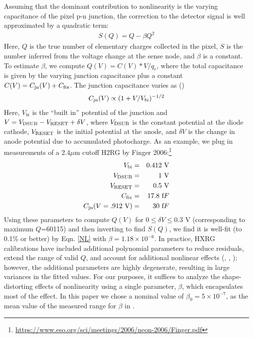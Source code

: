 \documentclass[11pt,preprint,flushrt]{aastex}
\begin{document}
Assuming that the dominant contribution to nonlinearity is the varying capacitance of the pixel p-n junction, the correction to the detector signal is well approximated by a quadratic term:
\begin{align}
S(Q)= Q - \beta Q ^2
\label{NL}
\end{align}
Here, $Q$ is the true number of elementary charges collected in the pixel, $S$ is the number inferred from the voltage change at the sense node, and $\beta$ is a constant.  To estimate $\beta$, we compute $Q(V)=C(V)*V/q_e$, where the total capacitance is given by the varying junction capacitance plus a constant $C(V) = C_{\rm jn}(V) + C_{\rm fix}$. The junction capacitance varies as (\citealt{mccaughrean87})
\begin{equation}
C_{\rm jn}(V) \propto (1+V/V_{bi})^{-1/2}
\end{equation}
Here, $V_{bi}$ is the ``built in'' potential of the junction and $V=V_{\rm DSUB}-V_{\rm RESET}+\delta V$, where $V_{\rm DSUB}$ is the constant potential at the diode cathode, $V_{\rm RESET}$ is the initial potential at the anode, and $\delta V$ is the change in anode potential due to accumulated photocharge.  As an example, we plug in measurements of a 2.4$\mu$m cutoff H2RG by Finger 2006:\footnote{\url{https://www.eso.org/sci/meetings/2006/neon-2006/Finger.pdf}}
\begin{eqnarray*}
V_{\rm bi} &=& 0.412\ {\mbox V} \\
V_{\rm DSUB} &=& 1\ {\mbox V} \\
V_{\rm RESET} &=& 0.5\ {\mbox V} \\
C_{\rm fix} &=& 17.8\ {\mbox fF} \\
C_{\rm jn}(V=.912\ {\mbox V}) &=& 30\ {\mbox fF}
\end{eqnarray*}
Using these parameters to compute $Q(V)$ for $ 0\le \delta V \le 0.3$ V (corresponding to maximum $Q$=60115) and then inverting to find $S(Q)$, we find it is well-fit (to 0.1\% or better) by Eqn. \ref{NL} with $\beta=1.18 \times 10^{-6}$. In practice, HXRG calibrations have included additional polynomial parameters to reduce residuals, extend the range of valid $Q$, and account for additional nonlinear effects (\citealt{hilbert04}, \citealt{hilbert08}, \citealt{hilbert14}); however, the additional parameters are highly degenerate, resulting in large variances in the fitted values.  For our purposes, it suffices to analyze the shape-distorting effects of nonlinearity using a single parameter, $\beta$, which encapsulates most of the effect. In this paper we chose a nominal value of $\beta_0=5\times 10^{-7}$, as the mean value of the measured range for $\beta$ in \citealt{hilbert14}. 
\end{document}
